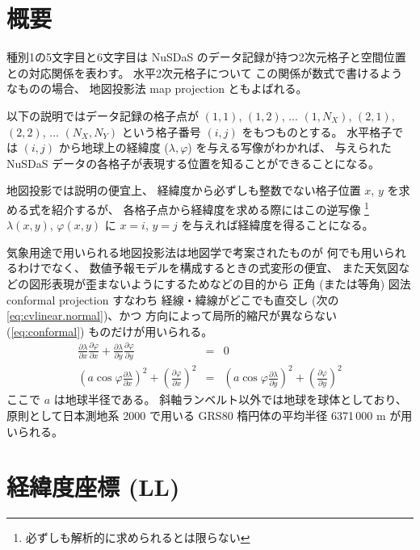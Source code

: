 \label{chap:proj}

\newcommand{\DP}[2]{\frac{\partial{#1}}{\partial{#2}}}%

\section{概要}

種別1の5文字目と6文字目は
NuSDaS のデータ記録が持つ2次元格子と空間位置との対応関係を表わす。
水平2次元格子について
この関係が数式で書けるようなものの場合、
地図投影法 map projection ともよばれる。

以下の説明ではデータ記録の格子点が
$(1, 1)$, $(1, 2)$, ... $(1, N_X)$, $(2, 1)$, $(2, 2)$, ... $(N_X, N_Y)$
という格子番号 $(i, j)$ をもつものとする。
水平格子では
$(i, j)$ から地球上の経緯度 ($\lambda, \varphi$)
を与える写像がわかれば、
与えられた NuSDaS データの各格子が表現する位置を知ることができることになる。

地図投影では説明の便宜上、
経緯度から必ずしも整数でない格子位置 $x$, $y$ を求める式を紹介するが、
各格子点から経緯度を求める際にはこの逆写像%
\footnote{必ずしも解析的に求められるとは限らない}
\(\lambda(x, y)\),
\(\varphi(x, y)\)
に
\(x = i\), \(y = j\)
を与えれば経緯度を得ることになる。

気象用途で用いられる地図投影法は地図学で考案されたものが
何でも用いられるわけでなく、
数値予報モデルを構成するときの式変形の便宜、
また天気図などの図形表現が歪まないようにするためなどの目的から
正角 (または等角) 図法 conformal projection すなわち
経線・緯線がどこでも直交し (次の \ref{eq:cvlinear.normal})、かつ
方向によって局所的縮尺が異ならない (\ref{eq:conformal})
ものだけが用いられる。
%
\begin{eqnarray}
 \DP{\lambda}{x}\DP{\varphi}{x} + \DP{\lambda}{y}\DP{\varphi}{y} &=& 0
 \label{eq:cvlinear.normal}
\\
 \left(a\cos\varphi\DP{\lambda}{x}\right)^2 + \left(\DP{\varphi}{x}\right)^2
 &=&
 \left(a\cos\varphi\DP{\lambda}{y}\right)^2 + \left(\DP{\varphi}{y}\right)^2
 \label{eq:conformal}
\end{eqnarray}
%
ここで $a$ は地球半径である。
斜軸ランベルト以外では地球を球体としており、
原則として日本測地系 2000 で用いる GRS80 楕円体の平均半径
6371\,000 m が用いられる。

\section{経緯度座標 (LL)}

